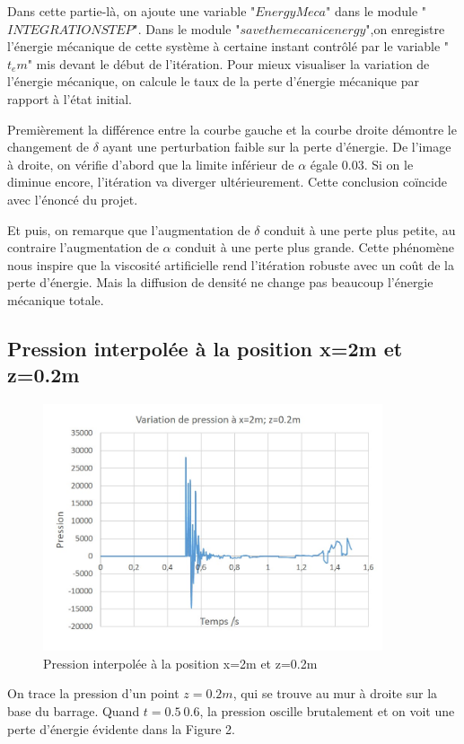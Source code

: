 \documentclass{article}
\begin{document}
Dans cette partie-là, on ajoute une variable "$EnergyMeca$" dans le module "$INTEGRATION STEP$". Dans le module "$save the mecanic energy$",on enregistre l'énergie mécanique de cette système à certaine instant contrôlé par le variable "$t_em$" mis devant le début de l'itération. Pour mieux visualiser la variation de l'énergie mécanique, on calcule le taux de la perte d'énergie mécanique par rapport à l'état initial.

Premièrement la différence entre la courbe gauche et la courbe droite démontre le changement de $\delta$ ayant une perturbation faible sur la perte d'énergie. De l'image à droite, on vérifie d'abord que la limite inférieur de $\alpha$ égale $0.03$. Si on le diminue encore, l'itération va diverger ultérieurement. Cette conclusion coïncide avec l'énoncé du projet.

Et puis, on remarque que l'augmentation de $\delta$ conduit à une perte plus petite, au contraire l'augmentation de $\alpha$ conduit à une perte plus grande. Cette phénomène nous inspire que la viscosité artificielle rend l'itération robuste avec un coût de la perte d'énergie. Mais la diffusion de densité ne change pas beaucoup l'énergie mécanique totale. 
          
\subsection{Pression interpolée à la position x=2m et z=0.2m}
\begin{figure}[H]
	\begin{center}
		\includegraphics[width=10cm]{img/VariationPression.jpg}
	\end{center}
	\caption{Pression interpolée à la position x=2m et z=0.2m}
\end{figure}
On trace la pression d'un point $z=0.2m$, qui se trouve au mur à droite sur la base du barrage. Quand $t=0.5~0.6$, la pression oscille brutalement et on voit une perte d'énergie évidente dans la Figure 2. 
     
\end{document}
